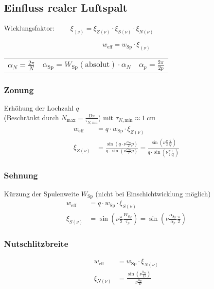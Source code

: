 \begin{sectionbox}
\subsection{Einfluss realer Luftspalt}
\label{subsec:wickl}
\begin{symbolbox}
  Wicklungsfaktor: $\qquad\xi_{(\nu)} = \xi_{Z(\nu)}\cdot\xi_{S(\nu)}\cdot\xi_{N(\nu)}$
\end{symbolbox}
\[w_\text{eff} = w_\text{Sp}\cdot\xi_{(\nu)}\]
\begin{tabularx}{\columnwidth}{cCc}
$\alpha_N = \frac{2\pi}{N}$ & $\alpha_\text{Sp} = W_\text{Sp}(\text{absolut})\cdot\alpha_N$ & $\alpha_p = \frac{2\pi}{2p}$
\end{tabularx}

\subsubsection{Zonung}
Erhöhung der Lochzahl $q$\\
(Beschränkt durch $N_\text{max} = \frac{D\pi}{\tau_{N,\text{min}}}$) mit $\tau_{N,\text{min}} \approx \SI{1}{\centi\meter}$
\begin{align*}
w_\text{eff} &= q\cdot w_\text{Sp}\cdot\xi_{Z(\nu)}\\
\xi_{Z(\nu)} &= \frac{\sin\left(q\cdot\nu\frac{\alpha_N}{2}p\right)}{q\cdot\sin\left(\nu\frac{\alpha_N}{2}p\right)} = \frac{\sin\left(\nu\frac{\pi}{2}\frac{q}{Q}\right)}{q\cdot\sin\left(\nu\frac{\pi}{2}\frac{1}{Q}\right)}
\end{align*}

\subsubsection{Sehnung}
Kürzung der Spulenweite $W_\text{Sp}$ (nicht bei Einschichtwicklung möglich)\\
\begin{align*}
w_\text{eff} &= q\cdot w_\text{Sp}\cdot\xi_{S(\nu)}\\
\xi_{S(\nu)} &= \sin\left(\nu\frac{\pi}{2}\frac{W_\text{Sp}}{\tau_p}\right) = \sin\left(\nu\frac{\alpha_\text{Sp}}{\alpha_p}\frac{\pi}{2}\right)
\end{align*}

\subsubsection{Nutschlitzbreite}
\begin{align*}
w_\text{eff} &= w_\text{Sp}\cdot\xi_{N(\nu)}\\
\xi_{N(\nu)} &= \frac{\sin\left(\nu\frac{b_N}{D}\right)}{\nu\frac{b_N}{D}}
\end{align*}
\end{sectionbox}
